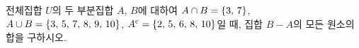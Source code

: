 전체집합 $U$의 두 부분집합 $A$, $B$에 대하여 $A\cap B=\{3,\mkern3mu 7\}$, $A\cup B=\{3,\mkern3mu 5,\mkern3mu 7,\mkern3mu 8,\mkern3mu 9,\mkern3mu 10\}$, ${A}^{\mathrm{c}}=\{2,\mkern3mu 5,\mkern3mu 6,\mkern3mu 8,\mkern3mu 10\}$일 때, 집합 $B-A$의 모든 원소의 합을 구하시오.
